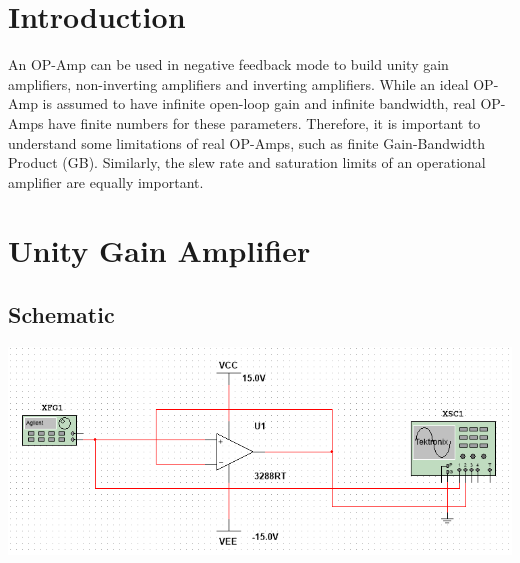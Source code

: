 \documentclass[a4paper, 12pt, english]{article}
\newenvironment{Figure}
  {\par\medskip\noindent\minipage{\linewidth}}
  {\endminipage\par\medskip}
\begin{document}


\newpage
\section{Introduction}
An OP-Amp can be used in negative feedback mode to build unity gain amplifiers, non-inverting amplifiers and inverting amplifiers. While an ideal OP-Amp is assumed to have infinite open-loop gain and infinite bandwidth, real OP-Amps have finite numbers for these parameters. Therefore, it is important to understand some limitations of real OP-Amps, such as finite Gain-Bandwidth Product (GB). Similarly, the slew rate and saturation limits of an operational amplifier are equally important.
\newline

\section{Unity Gain Amplifier}
\subsection{Schematic}
\begin{Figure}
 \centering
 \includegraphics[width=1.2\linewidth, scale=2]{images/unityGainSchematic.png}
\end{Figure}
\end{document}
